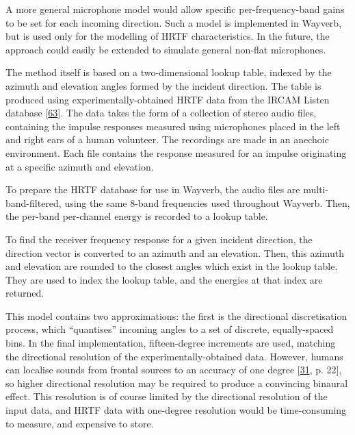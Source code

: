 \documentclass[]{scrreprt}
\begin{document}
A more general microphone model would allow specific per-frequency-band
gains to be set for each incoming direction. Such a model is implemented
in Wayverb, but is used only for the modelling of HRTF characteristics.
In the future, the approach could easily be extended to simulate general
non-flat microphones.

The method itself is based on a two-dimensional lookup table, indexed by
the azimuth and elevation angles formed by the incident direction. The
table is produced using experimentally-obtained HRTF data from the IRCAM
Listen database
{[}\protect\hyperlink{ref-oliverux5flistenux5f2003}{63}{]}. The data
takes the form of a collection of stereo audio files, containing the
impulse responses measured using microphones placed in the left and
right ears of a human volunteer. The recordings are made in an anechoic
environment. Each file contains the response measured for an impulse
originating at a specific azimuth and elevation.

To prepare the HRTF database for use in Wayverb, the audio files are
multi-band-filtered, using the same 8-band frequencies used throughout
Wayverb. Then, the per-band per-channel energy is recorded to a lookup
table.

To find the receiver frequency response for a given incident direction,
the direction vector is converted to an azimuth and an elevation. Then,
this azimuth and elevation are rounded to the closest angles which exist
in the lookup table. They are used to index the lookup table, and the
energies at that index are returned.

This model contains two approximations: the first is the directional
discretisation process, which ``quantises'' incoming angles to a set of
discrete, equally-spaced bins. In the final implementation,
fifteen-degree increments are used, matching the directional resolution
of the experimentally-obtained data. However, humans can localise sounds
from frontal sources to an accuracy of one degree
{[}\protect\hyperlink{ref-schroderux5fphysicallyux5f2011}{31}, p. 22{]},
so higher directional resolution may be required to produce a convincing
binaural effect. This resolution is of course limited by the directional
resolution of the input data, and HRTF data with one-degree resolution
would be time-consuming to measure, and expensive to store.
\end{document}
